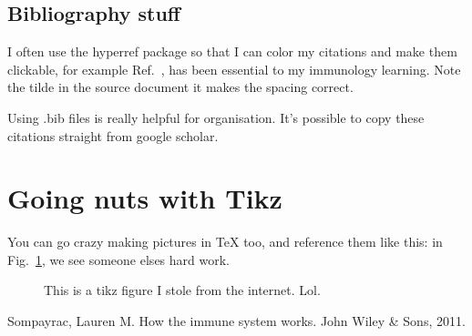 \documentclass[11pt]{article}
\begin{document}
\subsection{Bibliography stuff}

I often use the hyperref package so that I can color my citations and make them clickable, for example Ref.~\cite{Sompayrac2011}, has been essential to my immunology learning. Note the tilde in the source document it makes the spacing correct.

Using .bib files is really helpful for organisation. It's possible to copy these citations straight from google scholar.

\section{Going nuts with Tikz}

You can go crazy making pictures in TeX too, and reference them like this: in Fig.~\ref{fig1}, we see someone elses hard work. 


\begin{figure}[h!]\centering

\caption{This is a tikz figure I stole from the internet. Lol.}
\label{fig1}
\end{figure}


\begin{thebibliography}{10}
 Sompayrac, Lauren M. How the immune system works. John Wiley \& Sons, 2011.
\end{thebibliography}
\end{document}
